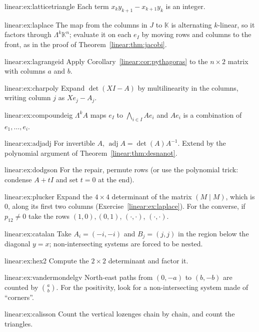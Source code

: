 \begin{hint}{linear:ex:latticetriangle}
Each term $x_ky_{k+1}-x_{k+1}y_k$ is an integer.
\end{hint}
\begin{hint}{linear:ex:laplace}
The map from the columns in $J$ to $\mathbb K$ is alternating $k$-linear, so it factors through $\Lambda^k\mathbb K^n$; evaluate
it on each $e_I$ by moving rows and columns to the front, as in the proof of Theorem~\ref{linear:thm:jacobi}.
\end{hint}
\begin{hint}{linear:ex:lagrangeid}
Apply Corollary~\ref{linear:cor:pythagoras} to the $n\times2$ matrix with columns $a$ and $b$.
\end{hint}
\begin{hint}{linear:ex:charpoly}
Expand $\det(XI-A)$ by multilinearity in the columns, writing column $j$ as $Xe_j-A_j$.
\end{hint}
\begin{hint}{linear:ex:compoundeig}
$\Lambda^kA$ maps $e_I$ to $\bigwedge_{i\in I}Ae_i$ and $Ae_i$ is a combination of $e_1,\dots,e_i$.
\end{hint}
\begin{hint}{linear:ex:adjadj}
For invertible $A$, $\operatorname{adj}A=\det(A)A^{-1}$. Extend by the polynomial argument of Theorem~\ref{linear:thm:desnanot}.
\end{hint}
\begin{hint}{linear:ex:dodgson}
For the repair, permute rows (or use the polynomial trick: condense $A+tI$ and set $t=0$ at the end).
\end{hint}
\begin{hint}{linear:ex:plucker}
Expand the $4\times4$ determinant of the matrix $(M\mid M)$, which is $0$, along its first two columns
(Exercise~\ref{linear:ex:laplace}). For the converse, if $p_{12}\ne0$ take the rows $(1,0),(0,1)$, $(\cdot,\cdot)$, $(\cdot,\cdot)$.
\end{hint}
\begin{hint}{linear:ex:catalan}
Take $A_i=(-i,-i)$ and $B_j=(j,j)$ in the region below the diagonal $y=x$; non-intersecting systems are forced to be
nested.
\end{hint}
\begin{hint}{linear:ex:hex2}
Compute the $2\times2$ determinant and factor it.
\end{hint}
\begin{hint}{linear:ex:vandermondelgv}
North-east paths from $(0,-a)$ to $(b,-b)$ are counted by $\binom ab$. For the positivity, look for a non-intersecting
system made of ``corners''.
\end{hint}
\begin{hint}{linear:ex:calisson}
Count the vertical lozenges chain by chain, and count the triangles.
\end{hint}

